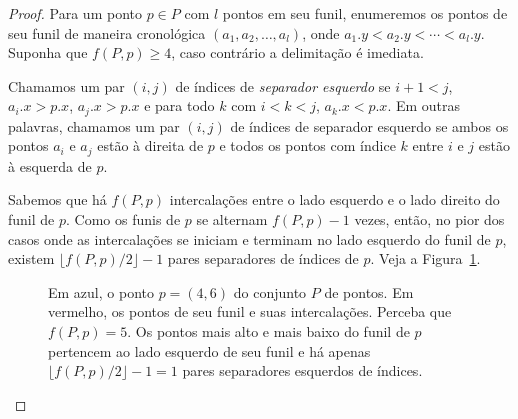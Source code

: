 \begin{proof} \label{lema:passo-intermediario}
    Para um ponto $p \in P$ com $l$ pontos em seu funil, enumeremos os pontos de seu funil de maneira cronológica $(a_1,a_2,\ldots,a_l)$, onde $a_1.y < a_2.y < \cdots < a_l.y$. Suponha que $f(P,p) \geq 4$, caso contrário a delimitação é imediata.

    Chamamos um par $(i,j)$ de índices de \textit{separador esquerdo} se $i + 1 < j$, $a_i.x > p.x$, $a_j.x > p.x$ e para todo $k$ com $i < k < j$, $a_k.x < p.x$. Em outras palavras, chamamos um par $(i,j)$ de índices de separador esquerdo se ambos os pontos $a_i$ e $a_j$ estão à direita de $p$ e todos os pontos com índice $k$ entre $i$ e $j$ estão à esquerda de $p$.

    Sabemos que há $f(P,p)$ intercalações entre o lado esquerdo e o lado direito do funil de $p$. Como os funis de $p$ se alternam $f(P,p) -1$ vezes, então, no pior dos casos onde as intercalações se iniciam e terminam no lado esquerdo do funil de $p$, existem  $\lfloor f(P,p)/2 \rfloor - 1$ pares separadores de índices de $p$. Veja a Figura~\ref{fig:bound-z-rets}.

    \begin{figure}
        \caption{Em azul, o ponto $p = (4,6)$ do conjunto $P$ de pontos. Em vermelho, os pontos de seu funil e suas intercalações. Perceba que $f(P,p) = 5$. Os pontos mais alto e mais baixo do funil de $p$ pertencem ao lado esquerdo de seu funil e há apenas $\lfloor f(P,p)/2 \rfloor - 1 = 1$ pares separadores esquerdos de índices.}
    \label{fig:bound-z-rets}
    \end{figure}


\end{proof}

